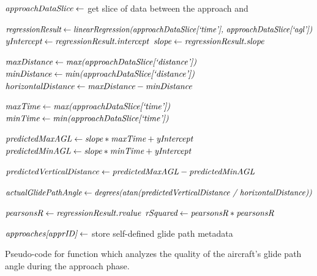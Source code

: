             
            \begin{algorithm}[t]
                \begin{algorithmic}[1]\raggedright
                    \State $ \textit{approachDataSlice} \gets $ get slice of data between the approach  and 
                    
                    \State $ \var{regressionResult} \gets \var{linearRegression(} \break \var{approachDataSlice[`time'], approachDataSlice[`agl'])} $
                    \State $ \textit{yIntercept} \gets \textit{regressionResult.intercept} $
                    \State $ \textit{slope} \gets \textit{regressionResult.slope} $
                    
                    \State $ \textit{maxDistance} \gets \textit{max(approachDataSlice[`distance'])} $
                    \State $ \textit{minDistance} \gets \textit{min(approachDataSlice[`distance'])} $
                    \State $ \textit{horizontalDistance} \gets \textit{maxDistance} - \textit{minDistance} $
                    
                    \State $ \textit{maxTime} \gets \textit{max(approachDataSlice[`time'])} $
                    \State $ \textit{minTime} \gets \textit{min(approachDataSlice[`time'])} $
                    
                    \State $ \textit{predictedMaxAGL} \gets \textit{slope} * \textit{maxTime} + \textit{yIntercept} $
                    \State $ \textit{predictedMinAGL} \gets \textit{slope} * \textit{minTime} + \textit{yIntercept} $
                    
                    \State $ \textit{predictedVerticalDistance} \gets \textit{predictedMaxAGL} - \textit{predictedMinAGL} $
                    
                    \State $ \var{actualGlidePathAngle} \gets \var{degrees(} \break \var{atan(predictedVerticalDistance / horizontalDistance))} $
                    
                    \State $ \textit{pearsonsR} \gets \textit{regressionResult.rvalue} $
                    \State $ \textit{rSquared} \gets \textit{pearsonsR} * \textit{pearsonsR} $
                    
                    \State $ \textit{approaches[apprID]} \gets $ store self-defined glide path metadata
                    \State \Return {}
                \EndFunction
                \end{algorithmic}
                \caption{Pseudo-code for function which analyzes the quality of the aircraft's glide path angle during the approach phase.}
                \label{alg:analyze_glide_path}
            \end{algorithm}
    

